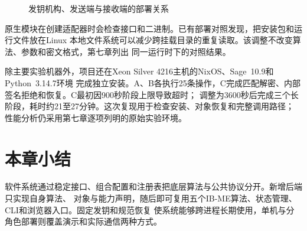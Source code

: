 \begin{figure}[H]
\centering
{}
\caption{发钥机构、发送端与接收端的部署关系}
\label{fig:deployment}
\end{figure}

原生模块在创建适配器时会检查接口和二进制。已有部署对照发现，把安装包和运行文件放在Linux
本地文件系统可以减少跨挂载目录的重复读取。该调整不改变算法、参数和密文格式，第七章列出
同一运行时下的对照结果。

除主要实验机器外，项目还在Xeon Silver 4216主机的NixOS、Sage~10.9和Python~3.14.7环境
完成独立安装。A、B各执行25条操作，C完成匹配解密、内部签名拒绝和恢复。C最初因900秒阶段上限导致超时；
调整为3600秒后完成三个长阶段，耗时约21至27分钟。这次复现用于检查安装、对象恢复和完整调用路径；
性能分析仍采用第七章逐项列明的原始实验环境。

\section{本章小结}

软件系统通过稳定接口、组合配置和注册表把底层算法与公共协议分开。新增后端只实现自身算法、
对象与能力声明，随后即可复用五个IB-ME算法、状态管理、CLI和浏览器入口。固定发钥和规范恢复
使系统能够跨进程长期使用，单机与分角色部署则覆盖演示和实际通信两种方式。
